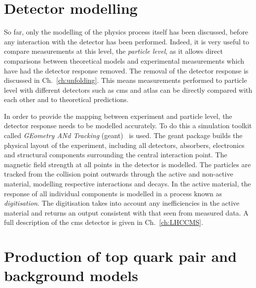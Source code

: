 \section{Detector modelling} %
\label{sec:detector_modelling}

So far, only the modelling of the physics process itself has been discussed, before any interaction with the detector has been performed.
Indeed, it is very useful to compare measurements at this level, the \textit{particle level}, as it allows direct comparisons between theoretical models and experimental measurements which have had the detector response removed.
The removal of the detector response is discussed in Ch.~\ref{ch:unfolding}.
This means measurements performed to particle level with different detectors such as \acrshort{cms} and \acrshort{atlas} can be directly compared with each other and to theoretical predictions.

In order to provide the mapping between experiment and particle level, the detector response needs to be modelled accurately.
To do this a simulation toolkit called \textit{GEometry ANd Tracking} (\acrshort{geant})~\cite{Gen:GEANT} is used.
The \acrshort{geant} package builds the physical layout of the experiment, including all detectors, absorbers, electronics and structural components surrounding the central interaction point.
The magnetic field strength at all points in the detector is modelled.
The particles are tracked from the collision point outwards through the active and non-active material, modelling respective interactions and decays.
In the active material, the response of all individual components is modelled in a process known as \textit{digitisation}.
The digitisation takes into account any inefficiencies in the active material and returns an output consistent with that seen from measured data.
A full description of the \acrshort{cms} detector is given in Ch.~\ref{ch:LHCCMS}.


\section{Production of top quark pair and background models}
\label{sec:ttMC}

